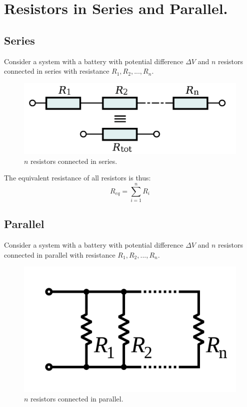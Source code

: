 \documentclass[11pt, letterpaper]{article}
\begin{document}
\section{Resistors in Series and Parallel.}
\subsection{Series}
Consider a system with a battery with potential difference $\Delta V$ and $n$ resistors connected in series with resistance $R_1, R_2,...,R_n$. 
\begin{figure}[h!]
	\centering
	\includegraphics[scale=0.2]{series}
	\caption{$n$ resistors connected in series.}
	\label{fig:series}
\end{figure}

The equivalent resistance of all resistors is thus:
\begin{equation}\label{eqn:series}
	\boxed{R_{eq} = \sum_{i = 1}^{n} R_i}
\end{equation}

\subsection{Parallel}
Consider a system with a battery with potential difference $\Delta V$ and $n$ resistors connected in parallel with resistance $R_1, R_2,...,R_n$.
\begin{figure}[h!]
	\centering
	\includegraphics[scale=0.1]{parallel}
	\caption{$n$ resistors connected in parallel.}
	\label{fig:parallel}
\end{figure}
\end{document}
